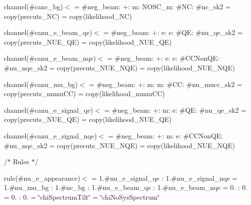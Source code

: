 channel(\#canc\+\_\+bg)$<$  = \#neg\+\_\+beam\+: +\+: m\+: N\+O\+S\+C\+\_\+m\+: \#\+NC\+: \#nc\+\_\+sk2  = copy(precuts\+\_\+\+NC)  = copy(likelihood\+\_\+\+NC) \begin{quote}


\end{quote}
channel(\#canu\+\_\+e\+\_\+beam\+\_\+qe)$<$  = \#neg\+\_\+beam\+: +\+: e\+: e\+: \#\+QE\+: \#nu\+\_\+qe\+\_\+sk2  = copy(precuts\+\_\+\+N\+U\+E\+\_\+\+QE)  = copy(likelihood\+\_\+\+N\+U\+E\+\_\+\+QE) \begin{quote}


\end{quote}
channel(\#canu\+\_\+e\+\_\+beam\+\_\+nqe)$<$  = \#neg\+\_\+beam\+: +\+: e\+: e\+: \#\+C\+C\+Non\+QE\+: \#nu\+\_\+nqe\+\_\+sk2  = copy(precuts\+\_\+\+N\+U\+E\+\_\+\+N\+QE)  = copy(likelihood\+\_\+\+N\+U\+E\+\_\+\+N\+QE) \begin{quote}


\end{quote}
channel(\#canu\+\_\+mu\+\_\+bg)$<$  = \#neg\+\_\+beam\+: +\+: m\+: m\+: \#\+CC\+: \#nu\+\_\+mucc\+\_\+sk2  = copy(precuts\+\_\+numu\+CC)  = copy(likelihood\+\_\+numu\+CC) \begin{quote}


\end{quote}
channel(\#canu\+\_\+e\+\_\+signal\+\_\+qe)$<$  = \#neg\+\_\+beam\+: +\+: m\+: e\+: \#\+QE\+: \#nu\+\_\+qe\+\_\+sk2  = copy(precuts\+\_\+\+N\+U\+E\+\_\+\+QE)  = copy(likelihood\+\_\+\+N\+U\+E\+\_\+\+QE) \begin{quote}


\end{quote}
channel(\#canu\+\_\+e\+\_\+signal\+\_\+nqe)$<$  = \#neg\+\_\+beam\+: +\+: m\+: e\+: \#\+C\+C\+Non\+QE\+: \#nu\+\_\+nqe\+\_\+sk2  = copy(precuts\+\_\+\+N\+U\+E\+\_\+\+N\+QE)  = copy(likelihood\+\_\+\+N\+U\+E\+\_\+\+N\+QE) \begin{quote}


\end{quote}


/$\ast$ Rules $\ast$/

rule(\#nu\+\_\+e\+\_\+appearance)$<$  = 1.\#nu\+\_\+e\+\_\+signal\+\_\+qe \+: 1.\#nu\+\_\+e\+\_\+signal\+\_\+nqe  = 1.\#nu\+\_\+mu\+\_\+bg \+: 1.\#nc\+\_\+bg \+: 1.\#nu\+\_\+e\+\_\+beam\+\_\+qe \+: 1.\#nu\+\_\+e\+\_\+beam\+\_\+nqe  = 0. \+: 0.  = 0. \+: 0.  = \char`\"{}chi\+Spectrum\+Tilt\char`\"{}  = \char`\"{}chi\+No\+Sys\+Spectrum\char`\"{} \begin{quote}


\end{quote}


